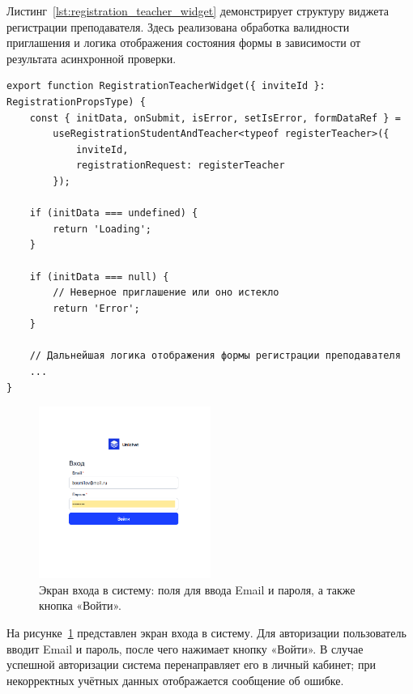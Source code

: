 Листинг~\ref{lst:registration_teacher_widget} демонстрирует структуру виджета регистрации преподавателя. Здесь реализована обработка валидности приглашения и логика отображения состояния формы в зависимости от результата асинхронной проверки.

\begin{lstlisting}[caption={Виджет регистрации преподавателя}, label={lst:registration_teacher_widget}]
export function RegistrationTeacherWidget({ inviteId }: RegistrationPropsType) {
    const { initData, onSubmit, isError, setIsError, formDataRef } =
        useRegistrationStudentAndTeacher<typeof registerTeacher>({
            inviteId,
            registrationRequest: registerTeacher
        });

    if (initData === undefined) {
        return 'Loading';
    }

    if (initData === null) {
        // Неверное приглашение или оно истекло
        return 'Error';
    }

    // Дальнейшая логика отображения формы регистрации преподавателя
    ...
}
\end{lstlisting}

\begin{figure}[h]
    \centering
    \includegraphics[width=0.5\textwidth]{static/presintation/LoginPage.png} %
    \caption{Экран входа в систему: поля для ввода Email и пароля, а также кнопка «Войти».}
    \label{fig:login_page}
\end{figure}

На рисунке~\ref{fig:login_page} представлен экран входа в систему. Для авторизации пользователь вводит Email и пароль, после чего нажимает кнопку «Войти». В случае успешной авторизации система перенаправляет его в личный кабинет; при некорректных учётных данных отображается сообщение об ошибке.

